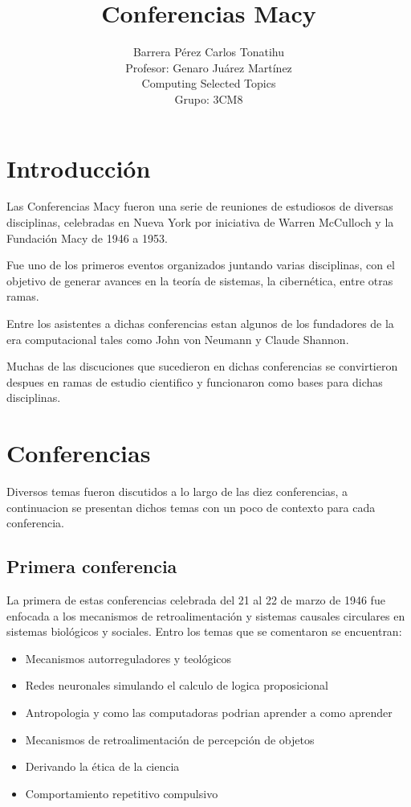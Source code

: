\documentclass[a4paper, 12pt]{article}
\title{Conferencias Macy}
\author{Barrera Pérez Carlos Tonatihu \\ Profesor: Genaro Juárez Martínez \\ Computing Selected Topics \\ Grupo: 3CM8 }
\begin{document}
\maketitle
\newpage
\tableofcontents
\newpage
\section{Introducción}
Las Conferencias Macy fueron una serie de reuniones de estudiosos de diversas disciplinas, celebradas en Nueva York por iniciativa de Warren McCulloch y la Fundación Macy de 1946 a 1953. \cite{WEB}

Fue uno de los primeros eventos organizados juntando varias disciplinas, con el objetivo de generar avances en la teoría de sistemas, la cibernética, entre otras ramas.

Entre los asistentes a dichas conferencias estan algunos de los fundadores de la era computacional tales como John von Neumann y Claude Shannon.

Muchas de las discuciones que sucedieron en dichas conferencias se convirtieron despues en ramas de estudio cientifico y funcionaron como bases para dichas disciplinas. 

\section{Conferencias}
Diversos temas fueron discutidos a lo largo de las diez conferencias, a continuacion se presentan dichos temas con un poco de contexto para cada conferencia.
\subsection{Primera conferencia}
La primera de estas conferencias celebrada del 21 al 22 de marzo de 1946 fue enfocada a los mecanismos de retroalimentación y sistemas causales circulares en sistemas biológicos y sociales. Entro los temas que se comentaron se encuentran:
\begin{itemize}
 \item Mecanismos autorreguladores y teológicos
 \item Redes neuronales simulando el calculo de logica proposicional
 \item Antropologia y como las computadoras podrian aprender a como aprender
 \item Mecanismos de retroalimentación de percepción de objetos
 \item Derivando la ética de la ciencia
 \item Comportamiento repetitivo compulsivo
\end{itemize}
\end{document}
